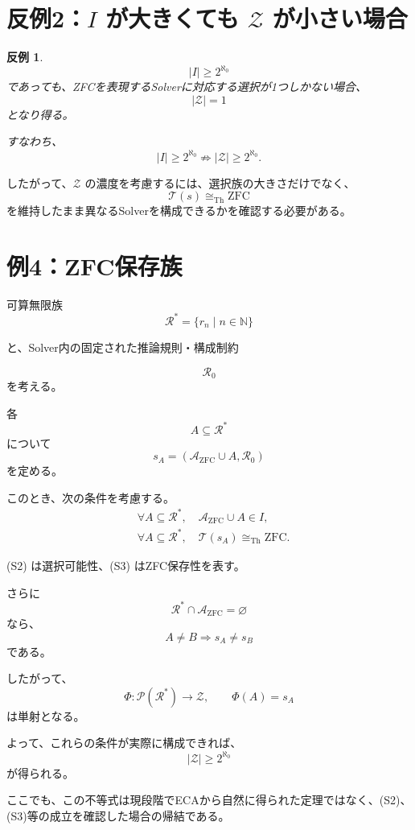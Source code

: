 \documentclass[a4paper,11pt]{article}
\newtheorem{counterexample}[definition]{反例}
\newcommand{\ZFC}{\mathrm{ZFC}}
\begin{document}
\section{反例2：$I$ が大きくても $\mathcal{Z}$ が小さい場合}

\begin{counterexample}
\[
|I|\ge2^{\aleph_0}
\]
であっても、ZFCを表現するSolverに対応する選択が1つしかない場合、
\[
|\mathcal{Z}|=1
\]
となり得る。

すなわち、
\[
|I|\ge2^{\aleph_0}
\not\Rightarrow
|\mathcal{Z}|\ge2^{\aleph_0}.
\]
\end{counterexample}

したがって、\(\mathcal{Z}\) の濃度を考慮するには、選択族の大きさだけでなく、
\[
\mathcal{T}(s)\cong_{\mathrm{Th}}\ZFC
\]
を維持したまま異なるSolverを構成できるかを確認する必要がある。

\section{例4：ZFC保存族}

可算無限族
\[
\mathcal{R}^*
=
\{r_n\mid n\in\mathbb{N}\}
\]

と、Solver内の固定された推論規則・構成制約

\[
\mathcal{R}_0
\]
を考える。

各
\[
A\subseteq\mathcal{R}^*
\]
について
\[
s_A
=
\left(
\mathcal{A}_{\mathrm{ZFC}}\cup A,
\mathcal{R}_0
\right)
\]
を定める。

このとき、次の条件を考慮する。
\begin{align}
&\forall A\subseteq\mathcal{R}^*,
\quad
\mathcal{A}_{\mathrm{ZFC}}\cup A\in I,
\tag{S2}\\
&\forall A\subseteq\mathcal{R}^*,
\quad
\mathcal{T}(s_A)
\cong_{\mathrm{Th}}\ZFC.
\tag{S3}
\end{align}

(S2) は選択可能性、(S3) はZFC保存性を表す。

さらに
\[
\mathcal{R}^*\cap\mathcal{A}_{\mathrm{ZFC}}
=
\varnothing
\]
なら、
\[
A\neq B
\Longrightarrow
s_A\neq s_B
\]
である。

したがって、
\[
\Phi:
\mathcal{P}(\mathcal{R}^*)\to\mathcal{Z},
\qquad
\Phi(A)=s_A
\]
は単射となる。

よって、これらの条件が実際に構成できれば、
\[
\boxed{
|\mathcal{Z}|
\ge
2^{\aleph_0}
}
\]
が得られる。

ここでも、この不等式は現段階でECAから自然に得られた定理ではなく、(S2)、(S3)等の成立を確認した場合の帰結である。
\end{document}
